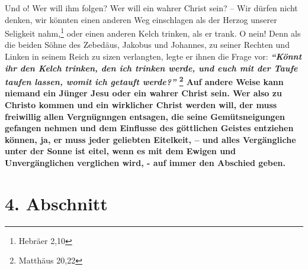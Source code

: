 Und o! Wer will ihm folgen? Wer will ein wahrer Christ sein? -- Wir dürfen nicht
denken, wir könnten einen anderen Weg einschlagen als der Herzog unserer
Seligkeit nahm,\footnote{Hebräer 2,10}
oder einen anderen Kelch trinken, als er
trank. O nein! Denn als die beiden Söhne des Zebedäus,
Jakobus und Johannes, zu
seiner Rechten und Linken in seinem Reich zu sizen verlangten, legte er ihnen
die Frage vor:
\label{ref:16_03_kelch_tringen}
\textbf{\textit{"`Könnt ihr den Kelch trinken, den ich trinken werde, und euch
mit der Taufe taufen lassen, womit ich getauft werde?"'}
\footnote{Matthäus 20,22}
Auf andere Weise kann niemand ein Jünger Jesu oder ein wahrer Christ sein. Wer
also zu Christo kommen und ein wirklicher Christ werden will, der muss
freiwillig
allen Vergnügnngen entsagen, die seine Gemütsneigungen gefangen nehmen und dem
Einflusse des göttlichen Geistes entziehen können, ja, er muss jeder geliebten
Eitelkeit, -- und alles Vergängliche unter der Sonne ist eitel, wenn es mit dem
Ewigen und Unvergänglichen verglichen wird, - auf immer den Abschied geben.}

\section{4. Abschnitt} \label{kap16_ab4}

